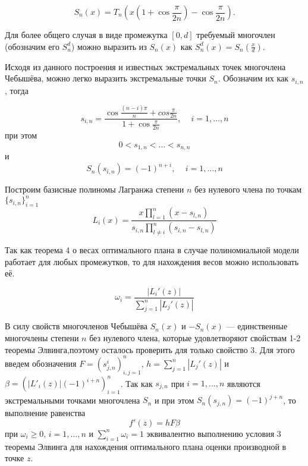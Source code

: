 \documentclass[specialist,
               substylefile = spbu.rtx,
               subf,href,colorlinks=true, 12pt]{disser}
\theoremstyle{definition}
\newcommand\abs[1]{\left\lvert#1\right\rvert}
\begin{document}
	\begin{equation*}
		S_n(x) = T_n \left(x \left(1 + \cos \frac{\pi}{2n} \right) - \cos \frac{\pi}{2n} \right).
	\end{equation*}	
	
	Для более общего случая в виде промежутка $[0, d]$ требуемый многочлен (обозначим его $S_n^d$) можно выразить из $S_n(x)$ как $S_n^d(x) = S_n\left(\frac{x}{d}\right)$.
	
	Исходя из данного построения и известных экстремальных точек многочлена Чебышёва, можно легко выразить экстремальные точки $S_n$. Обозначим их как $s_{i, n}$, тогда
	
	\begin{equation*}
		s_{i, n} = \frac{\cos \frac{(n - i) \pi}{n} + cos \frac{\pi}{2n}}{1 + \cos \frac{\pi}{2n}} , \, \quad i = 1, \ldots, n 
	\end{equation*}
	при этом
	\begin{equation*}
		0 < s_{1, n} < \ldots < s_{n, n}
	\end{equation*}
	и
	\begin{equation*}
		S_n(s_{i, n}) = (-1)^{n + i} , \, \quad i = 1, \ldots, n 
	\end{equation*}

	Построим базисные полиномы Лагранжа степени $n$ без нулевого члена по точкам $\{s_{i, n}\}_{i=1}^n$
	\begin{equation*}
		L_{i}(x) = \frac{x \prod_{l=1}^n (x - s_{l,n})}{s_{i, n} \prod_{l \neq i}^n (s_{i,n} - s_{l,n})}
	\end{equation*}	
	
	Так как теорема 4 о весах оптимального плана в случае полиномиальной модели работает для любых промежутков, то для нахождения весов можно использовать её.
	
	\begin{equation*}
		\omega_i = \frac{\abs{L_i'(z)}}{\sum_{j=1}^n \abs{L_j'(z)}}
	\end{equation*}
	
	В силу свойств многочленов Чебышёва $S_n(x)$ и $-S_n(x)$ --- единственные многочлены степени $n$ без нулевого члена, которые удовлетворяют свойствам 1-2 теоремы Элвинга,поэтому осталось проверить для только свойство 3. Для этого введем обозначения $F = \left(s_{j,n}^i\right)^n_{i, j = 1}$, $h = \sum_{j=1}^n \abs{L_j'(z)}$ и $\beta = \left( \abs{L'_i(z)} (-1)^{i+n} \right)_{i=1}^n$. Так как $s_{j, n}$ при $i = 1, \ldots , n$ являются экстремальными точками многочлена $S_n$ и при этом $S_n(s_{j, n}) = (-1)^{j+n}$, то выполнение равенства 
	\begin{equation}
		\label{th:mateq3}
		f'(z) = hF\beta
	\end{equation}
	 при $\omega_i \geqslant 0 , \, i = 1, \ldots, n$ и $ \sum_{i=1}^n \omega_i = 1$ эквивалентно выполнению условия 3 теоремы Элвинга для нахождения оптимального плана оценки производной в точке $z$.
	 
\end{document}
